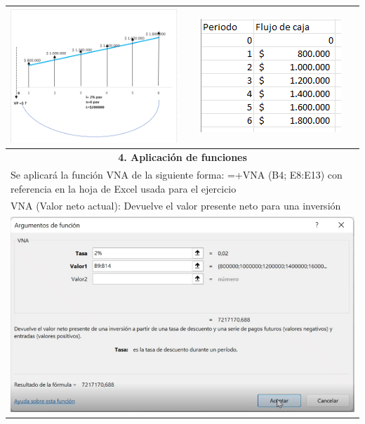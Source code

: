 \begin{center}
\begin{longtable}[H]{|p{0.5\linewidth}|p{0.5\linewidth}|}
  \multicolumn{1}{|c|}{ \includegraphics[trim=-5 -5 -5 -5 ,width=0.5\columnwidth]{9/ejemplo9.png}} & \multicolumn{1}{|c|}{ \includegraphics[trim=-5 -5 -5 -5 ,width=0.5\columnwidth]{9/Tabla de flujo Ejem 9.png}} \\ \hline
  \multicolumn{2}{|c|}{\cellcolor[HTML]{FFB183}\textbf{4. Aplicación de funciones}}                                                                                                                                   \\ \hline
  \multicolumn{2}{|p{\columnwidth}|}{Se aplicará la función VNA de la siguiente forma: \newline
  =+VNA (B4; E8:E13) con referencia en la hoja de Excel usada para el ejercicio}                                                                                                                                      \\
  \multicolumn{2}{|l|}{VNA (Valor neto actual): Devuelve el valor presente neto para una inversión}                                                                                                                              \\
  \multicolumn{2}{|c|}{ \includegraphics[trim=-5 -5 -5 -5 ,width=0.8\columnwidth]{9/Ejem9.PNG}}                                                                                                                       \\ \hline

\end{longtable}
\end{center}

